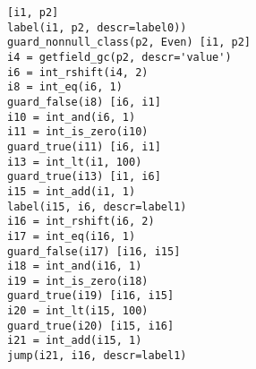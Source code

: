 \begin{lstlisting}[mathescape]
[i1, p2]
label(i1, p2, descr=label0))
guard_nonnull_class(p2, Even) [i1, p2]
i4 = getfield_gc(p2, descr='value')
i6 = int_rshift(i4, 2)
i8 = int_eq(i6, 1)
guard_false(i8) [i6, i1]
i10 = int_and(i6, 1)
i11 = int_is_zero(i10)
guard_true(i11) [i6, i1]
i13 = int_lt(i1, 100)
guard_true(i13) [i1, i6]
i15 = int_add(i1, 1)
label(i15, i6, descr=label1)
i16 = int_rshift(i6, 2)
i17 = int_eq(i16, 1)
guard_false(i17) [i16, i15]
i18 = int_and(i16, 1)
i19 = int_is_zero(i18)
guard_true(i19) [i16, i15]
i20 = int_lt(i15, 100)
guard_true(i20) [i15, i16]
i21 = int_add(i15, 1)
jump(i21, i16, descr=label1)
\end{lstlisting}
